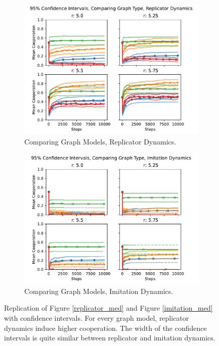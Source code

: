 \FloatBarrier 
\begin{figure}[!h]
  \begin{subfigure}[b]{0.45\textwidth}
    \includegraphics[width=1.1\textwidth]{images/Rep_gtype_med_CI.pdf}
    \caption{Comparing Graph Models, Replicator Dynamics.   }
    \label{rep_high_gtype_2}
  \end{subfigure}
  \hfill
  \begin{subfigure}[b]{0.45\textwidth}
    \includegraphics[width=1\textwidth]{images/ID_gtype_med_CI.pdf}
    \caption{Comparing Graph Models, Imitation Dynamics. }
    \label{ID_high_gtype_2}
  \end{subfigure}
  \caption{Replication of Figure  \ref{replicator_med} and Figure \ref{imitation_med} with confidence intervals. For every graph model, replicator dynamics induce higher cooperation. The width of the confidence intervals is quite similar between replicator and imitation dynamics. } \label{comparing_rep_ID_high}
\end{figure} 
\FloatBarrier

